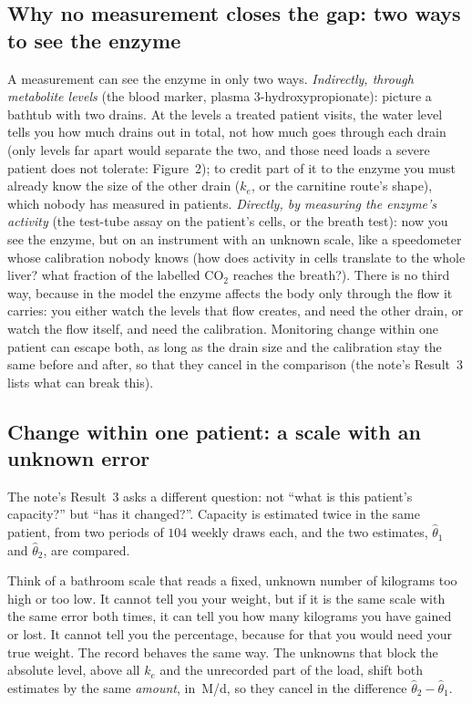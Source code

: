 \documentclass[11pt,a4paper]{article}
\newcommand{\um}{\,\textmu M/d}
\begin{document}
\subsection{Why no measurement closes the gap: two ways to see the enzyme} A measurement can
see the enzyme in only two ways. \emph{Indirectly, through metabolite levels} (the blood marker,
plasma 3-hydroxypropionate): picture a bathtub with two drains. At the levels a treated patient
visits, the water level tells you how much drains out in total, not how much goes through each
drain (only levels far apart would separate the two, and those need loads a severe patient does
not tolerate: Figure~2); to credit part of it to the enzyme you must already know
the size of the other drain ($k_e$, or the carnitine route's shape), which nobody has measured in
patients. \emph{Directly, by measuring the enzyme's activity} (the test-tube assay on the patient's
cells, or the breath test): now you see the enzyme, but on an instrument with an unknown scale,
like a speedometer whose calibration nobody knows (how does activity in cells translate to the
whole liver? what fraction of the labelled CO$_2$ reaches the breath?). There is no third way,
because in the model the enzyme affects the body only through the flow it carries: you either
watch the levels that flow creates, and need the other drain, or watch the flow itself, and need
the calibration. Monitoring change within one patient can escape both, as long as the drain size
and the calibration stay the same before and after, so that they cancel in the comparison (the
note's Result~3 lists what can break this).

\subsection{Change within one patient: a scale with an unknown error} The note's Result~3 asks
a different question: not ``what is this patient's capacity?'' but ``has it changed?''. Capacity
is estimated twice in the same patient, from two periods of $104$ weekly draws each, and the two
estimates, $\hat\theta_1$ and $\hat\theta_2$, are compared.

Think of a bathroom scale that reads a fixed, unknown number of kilograms too high or too low. It
cannot tell you your weight, but if it is the same scale with the same error both times, it can
tell you how many kilograms you have gained or lost. It cannot tell you the percentage, because
for that you would need your true weight. The record behaves the same way. The unknowns that block
the absolute level, above all $k_e$ and the unrecorded part of the load, shift both estimates by
the same \emph{amount}, in \um, so they cancel in the difference $\hat\theta_2-\hat\theta_1$.
\end{document}
